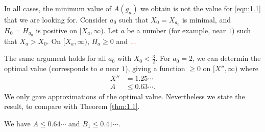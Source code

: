 In all cases, the minimum value of $A(g_a)$ we obtain is not the value for \eqref{eqn:1.1} that we are looking for.
Consider $a_0$ such that $X_0 = X_{a_0}$ is minimal, and $H_0 = H_{a_0}$ is positive on $[X_a, \infty)$.
Let $a$ be a number (for example, near $1$) such that $X_a > X_0$.
On $[X_a, \infty)$, $H_a \geq 0$ and \textcolor{red}{...}

The same argument holds for all $a_0$ with $X_0 < \frac{3}{2}$.
For $a_0 = 2$, we can determin the optimal value (corresponds to $a$ near $1$), giving a function $\geq 0$ on $[X'', \infty)$ where
\begin{equation}
    \label{eqn:2.6}
    \begin{aligned}
        X'' &= 1.25 \cdots \\
        A &\leq 0.63\cdots.
    \end{aligned}
\end{equation}
We only gave approximations of the optimal value.
Nevertheless we state the result, to compare with Theorem \ref{thm:1.1}.
\begin{theorem}
    \label{thm:2.1}
    We have $A \leq 0.64\cdots$ and $B_1 \leq 0.41\cdots$.
\end{theorem}
